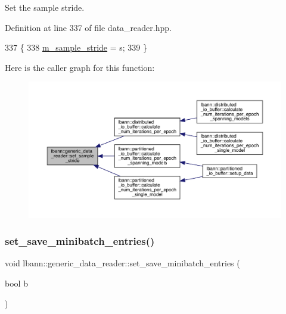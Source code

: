 Set the sample stride. 



Definition at line 337 of file data\+\_\+reader.\+hpp.


\begin{DoxyCode}
337                                       \{
338     \hyperlink{classlbann_1_1generic__data__reader_a58461c39de7e17eafc5b98aec99cbb9b}{m\_sample\_stride} = s;
339   \}
\end{DoxyCode}
Here is the caller graph for this function\+:\nopagebreak
\begin{figure}[H]
\begin{center}
\leavevmode
\includegraphics[width=350pt]{classlbann_1_1generic__data__reader_adb90391e3e9c8e3c2aba4d4a0911ca82_icgraph}
\end{center}
\end{figure}
\mbox{\label{classlbann_1_1generic__data__reader_a19fd7c4dc234fa09ac7619e47fe18454}} 
\subsubsection{\texorpdfstring{set\+\_\+save\+\_\+minibatch\+\_\+entries()}{set\_save\_minibatch\_entries()}}
{\footnotesize\ttfamily void lbann\+::generic\+\_\+data\+\_\+reader\+::set\+\_\+save\+\_\+minibatch\+\_\+entries (\begin{DoxyParamCaption}\item[{bool}]{b }\end{DoxyParamCaption})}

